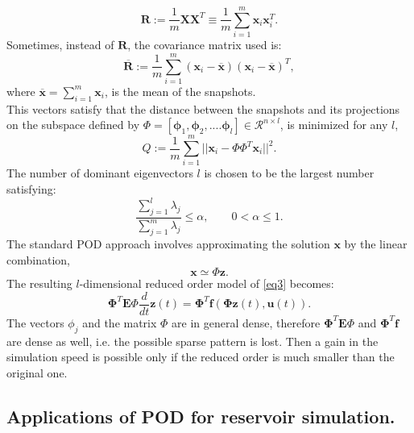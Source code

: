 \documentclass[a4paper,10pt]{report}
\begin{document}
\begin{equation}
\mathbf{R}:= \frac{1}{m}\mathbf{X}\mathbf{X}^T \equiv \frac{1}{m} \sum_{i=1}^m \mathbf{x}_i \mathbf{x}_i^T.
\end{equation}
Sometimes, instead of $\mathbf{R}$, the covariance matrix used is:
\begin{equation}
\overline{\mathbf{R}}:=\frac{1}{m} \sum_{i=1}^m (\mathbf{x}_i-\overline{\mathbf{x}}) (\mathbf{x}_i-\overline{\mathbf{x}})^T,
\end{equation}
where $\overline{\mathbf{x}}=\sum_{i=1}^m \mathbf{x}_i$, is the mean of the snapshots.\\
This vectors satisfy that the distance between the snapshots
and its projections on the subspace defined by 
$\Phi=[\mathbf{\phi}_1 , \mathbf{\phi}_2,.... \mathbf{\phi}_l] \in \mathcal{R}^{n \times l}$, 
is minimized for any $l$,
\begin{equation}
Q:=\frac{1}{m} \sum_{i=1}^m ||\mathbf{x}_i- \Phi \Phi ^T \mathbf{x}_i ||^2.
\end{equation}
The number of dominant eigenvectors $l$ is chosen to be the largest number satisfying:
\begin{equation}
\frac{\sum_{j=1}^l\lambda_j}{\sum_{j=1}^m\lambda_j}\leq \alpha, \qquad 0<\alpha \leq 1.
\end{equation}
The standard POD approach involves approximating the solution $ \mathbf{x}$ by the linear combination,
\begin{equation}
\mathbf{x}\simeq \Phi \mathbf{z}.
\end{equation}
The resulting $l$-dimensional reduced order model of \eqref{eq3} becomes: 
\begin{equation} \label{rod}
\mathbf{\Phi}^T \mathbf{E}\Phi \frac{d}{dt} \mathbf{z}(t)=\mathbf{\Phi}^T \mathbf{f}(\mathbf{\Phi} \mathbf{z}(t),\mathbf{u}(t)).
\end{equation} 
The vectors $\phi_j$ and the matrix $\Phi$ are in general dense, 
therefore $\mathbf{\Phi}^T \mathbf{E}\Phi$ and $\mathbf{\Phi}^T \mathbf{f}$ are dense as well, i.e. the possible sparse pattern is lost. 
Then a gain in the simulation speed is possible only if the reduced order is much smaller than the original one.\\

\subsection*{Applications of POD for reservoir simulation.}
\end{document}
